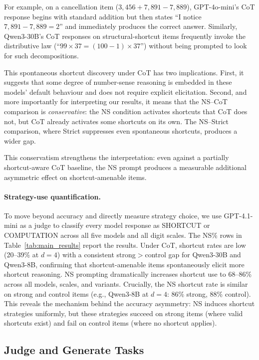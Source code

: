 For example, on a cancellation item ($3{,}456 + 7{,}891 - 7{,}889$), GPT-4o-mini's CoT response begins with standard addition but then states ``I notice $7{,}891 - 7{,}889 = 2$'' and immediately produces the correct answer.
Similarly, Qwen3-30B's CoT responses on structural-shortcut items frequently invoke the distributive law (``$99 \times 37 = (100-1) \times 37$'') without being prompted to look for such decompositions.

This spontaneous shortcut discovery under CoT has two implications.
First, it suggests that some degree of number-sense reasoning is embedded in these models' default behaviour and does not require explicit elicitation.
Second, and more importantly for interpreting our results, it means that the NS--CoT comparison is \emph{conservative}: the NS condition activates shortcuts that CoT does not, but CoT already activates some shortcuts on its own.
The NS--Strict comparison, where Strict suppresses even spontaneous shortcuts, produces a wider gap.

This conservatism strengthens the interpretation: even against a partially shortcut-aware CoT baseline, the NS prompt produces a measurable additional asymmetric effect on shortcut-amenable items.

\paragraph{Strategy-use quantification.}
To move beyond accuracy and directly measure strategy choice, we use GPT-4.1-mini as a judge to classify every model response as SHORTCUT or COMPUTATION across all five models and all digit scales.
The NS\% rows in Table~\ref{tab:main_results} report the results.
Under CoT, shortcut rates are low (20--39\% at $d{=}4$) with a consistent strong$>$control gap for Qwen3-30B and Qwen3-8B, confirming that shortcut-amenable items spontaneously elicit more shortcut reasoning.
NS prompting dramatically increases shortcut use to 68--86\% across all models, scales, and variants.
Crucially, the NS shortcut rate is similar on strong and control items (e.g., Qwen3-8B at $d{=}4$: 86\% strong, 88\% control).
This reveals the mechanism behind the accuracy asymmetry: NS induces shortcut strategies uniformly, but these strategies succeed on strong items (where valid shortcuts exist) and fail on control items (where no shortcut applies).

\subsection{Judge and Generate Tasks}
\label{sec:judge_generate}

